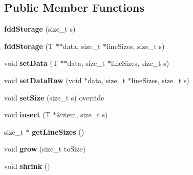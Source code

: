 \subsection*{Public Member Functions}
\begin{DoxyCompactItemize}
\item 
\hypertarget{classfaster_1_1fddStorage_3_01T_01_5_01_4_a949dbdd099a0dc2b54cec12cfb3f21b0}{}{\bfseries fdd\+Storage} (size\+\_\+t s)\label{classfaster_1_1fddStorage_3_01T_01_5_01_4_a949dbdd099a0dc2b54cec12cfb3f21b0}

\item 
\hypertarget{classfaster_1_1fddStorage_3_01T_01_5_01_4_a6272c1fb1e8bdff3c70f8fbe46c90fc4}{}{\bfseries fdd\+Storage} (T $\ast$$\ast$data, size\+\_\+t $\ast$line\+Sizes, size\+\_\+t s)\label{classfaster_1_1fddStorage_3_01T_01_5_01_4_a6272c1fb1e8bdff3c70f8fbe46c90fc4}

\item 
\hypertarget{classfaster_1_1fddStorage_3_01T_01_5_01_4_a4835be07a5ec230490f03da7cb8e3e16}{}void {\bfseries set\+Data} (T $\ast$$\ast$data, size\+\_\+t $\ast$line\+Sizes, size\+\_\+t s)\label{classfaster_1_1fddStorage_3_01T_01_5_01_4_a4835be07a5ec230490f03da7cb8e3e16}

\item 
\hypertarget{classfaster_1_1fddStorage_3_01T_01_5_01_4_aeb87efbfa61cc52dfc3bbdc3d09408dd}{}void {\bfseries set\+Data\+Raw} (void $\ast$data, size\+\_\+t $\ast$line\+Sizes, size\+\_\+t s)\label{classfaster_1_1fddStorage_3_01T_01_5_01_4_aeb87efbfa61cc52dfc3bbdc3d09408dd}

\item 
\hypertarget{classfaster_1_1fddStorage_3_01T_01_5_01_4_a5a918f95b08ed5a81fbb8831b0fc196e}{}void {\bfseries set\+Size} (size\+\_\+t s) override\label{classfaster_1_1fddStorage_3_01T_01_5_01_4_a5a918f95b08ed5a81fbb8831b0fc196e}

\item 
\hypertarget{classfaster_1_1fddStorage_3_01T_01_5_01_4_ae6b278b0a9dc5a96821438f0fb667489}{}void {\bfseries insert} (T $\ast$\&item, size\+\_\+t s)\label{classfaster_1_1fddStorage_3_01T_01_5_01_4_ae6b278b0a9dc5a96821438f0fb667489}

\item 
\hypertarget{classfaster_1_1fddStorage_3_01T_01_5_01_4_a250174b04b8f617d55d4a84e5de52ee3}{}size\+\_\+t $\ast$ {\bfseries get\+Line\+Sizes} ()\label{classfaster_1_1fddStorage_3_01T_01_5_01_4_a250174b04b8f617d55d4a84e5de52ee3}

\item 
\hypertarget{classfaster_1_1fddStorage_3_01T_01_5_01_4_a76493eba9895f152a95b547a2485bc3a}{}void {\bfseries grow} (size\+\_\+t to\+Size)\label{classfaster_1_1fddStorage_3_01T_01_5_01_4_a76493eba9895f152a95b547a2485bc3a}

\item 
\hypertarget{classfaster_1_1fddStorage_3_01T_01_5_01_4_adac945484d94be1469e4cf9eb6e8c16c}{}void {\bfseries shrink} ()\label{classfaster_1_1fddStorage_3_01T_01_5_01_4_adac945484d94be1469e4cf9eb6e8c16c}

\end{DoxyCompactItemize}
